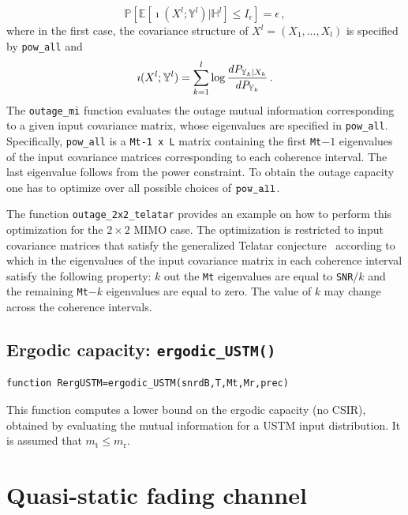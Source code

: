 \documentclass[a4paper,11p]{memoir}
\def\txant{m_{\mathrm{t}}} %
\def\rxant{m_{\mathrm{r}}} %
\def\tfdiv{l}  %
\def\PP{\mathbb{P}}
\def\EE{\mathbb{E}}
\begin{document}
$$ \PP[ \EE[\imath(X^\tfdiv; \mathbb{Y}^\tfdiv)|\mathbb{H}^\tfdiv] \le
I_\epsilon] = \epsilon\,, $$
where in the first case, the covariance structure of $X^\tfdiv=(X_1,\ldots,X_\tfdiv)$ is specified by \verb|pow_all| and 
$$\imath(X^\tfdiv; \mathbb{Y}^\tfdiv) = \sum_{k=1}^\tfdiv \log {dP_{\mathbb{Y}_k|X_k}\over dP_{\mathbb{Y}_k}}\,.$$
%
The \verb|outage_mi| function evaluates the outage mutual information corresponding to a given input covariance matrix, whose eigenvalues are specified in \verb|pow_all|. Specifically, \verb|pow_all| is a \verb|Mt-1 x L| matrix containing the
first \verb|Mt|$-1$ eigenvalues of the input covariance matrices corresponding to each coherence interval. The last eigenvalue follows from the power constraint. To obtain the outage capacity one has to optimize over all possible choices of $\verb|pow_all|$.

The function \verb|outage_2x2_telatar| provides an example on how to perform this optimization for the $2\times 2$ MIMO case. The optimization is restricted to input covariance matrices that satisfy the generalized Telatar conjecture~\cite[Eq.~(42)]{durisi14-12a} according to which in 
the eigenvalues of the input covariance matrix in each coherence interval satisfy the following property: $k$ out the \verb|Mt| eigenvalues are equal to \verb|SNR|$/k$ and the remaining \verb|Mt|$-k$ eigenvalues are equal to zero. The value of $k$ may change across the coherence intervals.


\section[Ergodic capacity]{Ergodic capacity: \texttt{ergodic\_USTM()}}
\begin{verbatim}
function RergUSTM=ergodic_USTM(snrdB,T,Mt,Mr,prec)
\end{verbatim}
This function computes a lower bound on the ergodic capacity (no CSIR), obtained by evaluating the mutual information for a USTM input distribution. 
It is assumed that $\txant\leq\rxant$.


\chapter{Quasi-static fading channel}

\label{ch:qs-fading-st}
\end{document}
